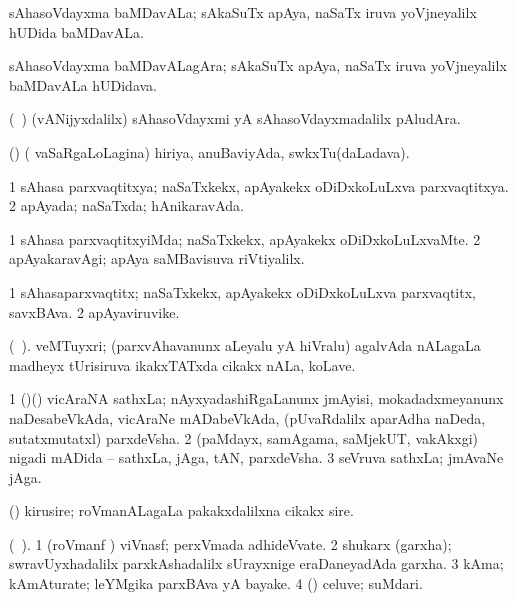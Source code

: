 {\bentry
{}
\gl{\nA}
\expl{}
\bmng
 sAhasoVdayxma baMDavALa; sAkaSuTx apAya, naSaTx iruva yoVjneyalilx hUDida baMDavALa. 
\emng
\eentry

\bentry
{}
\gl{\nA}
\expl{}
\bmng
 sAhasoVdayxma baMDavALagAra; sAkaSuTx apAya, naSaTx iruva yoVjneyalilx baMDavALa hUDidava. 
\emng
\eentry

\bentry
{} 
\gl{\nA}
\expl{}
\bmng
 (\kanmu\ \ca) (vANijyxdalilx) sAhasoVdayxmi yA sAhasoVdayxmadalilx pAludAra. 
\emng
\eentry

\bentry
{}
\gl{\nA}
\expl{}
\bmng
 (\birx) ( vaSaRgaLoLagina) hiriya, anuBaviyAda, swkxTu(daLadava). 
\emng
\eentry

\bentry
{} 
\gl{\gu}
\expl{}
\bmng
\bnum
\num{1} sAhasa parxvaqtitxya; naSaTxkekx, apAyakekx oDiDxkoLuLxva parxvaqtitxya. 
\num{2} apAyada; naSaTxda; hAnikaravAda. 
\enum
\emng
\eentry

\bentry
{} 
\gl{\kirxvi}
\expl{}
\bmng
\bnum
\num{1} sAhasa parxvaqtitxyiMda; naSaTxkekx, apAyakekx oDiDxkoLuLxvaMte. 
\num{2} apAyakaravAgi; apAya saMBavisuva riVtiyalilx. 
\enum
\emng
\eentry

\bentry
{} 
\gl{\nA}
\expl{}
\bmng
\bnum
\num{1} sAhasaparxvaqtitx; naSaTxkekx, apAyakekx oDiDxkoLuLxva parxvaqtitx, savxBAva. 
\num{2} apAyaviruvike. 
\enum
\emng
\eentry

\bentry
{} 
\gl{\nA}(\bava\ ). 
\bmng
 veMTuyxri; (parxvAhavanunx aLeyalu yA hiVralu) agalvAda nALagaLa madheyx tUrisiruva ikakxTATxda cikakx nALa, koLave. 
\emng
\eentry

\bentry
{} 
\gl{\nA}
\expl{}
\bmng
\bnum
\num{1} (\nAyxshA)(\ca) vicAraNA sathxLa; nAyxyadashiRgaLanunx jmAyisi, mokadadxmeyanunx naDesabeVkAda, vicAraNe mADabeVkAda, (pUvaRdalilx aparAdha naDeda, sutatxmutatxl) parxdeVsha. 
\num{2} (paMdayx, samAgama, saMjekUT, \mo vakAkxgi) nigadi mADida -- sathxLa, jAga, tAN, parxdeVsha. 
\num{3} seVruva sathxLa; jmAvaNe jAga. 
\enum
\emng
\eentry

\bentry
{} 
\gl{\nA}
\expl{}
\bmng
 (\aMrashA) kirusire; roVmanALagaLa pakakxdalilxna cikakx sire. 
\emng
\eentry

\bentry
{} 
\gl{\nA}(\bava\ ). 
\bmng
\bnum
\num{1} (roVmanf \pu) viVnasf; perxVmada adhideVvate. 
\num{2} shukarx (garxha); swravUyxhadalilx parxkAshadalilx sUrayxnige eraDaneyadAda garxha. 
\num{3} kAma; kAmAturate; leYMgika parxBAva yA bayake. 
\num{4} (\kAparx) celuve; suMdari. 
\enum
\emng
\eentry

}
